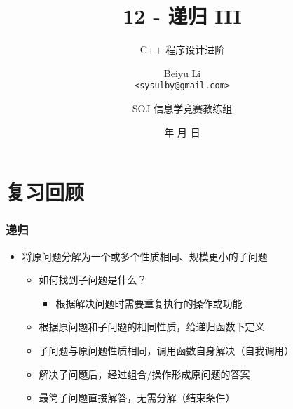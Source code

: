 \title[12 - 递归 III]
{12 - 递归 III}

\subtitle{C++ 程序设计进阶}

\author[Beiyu Li]
{Beiyu Li\\
\texttt{<sysulby@gmail.com>}}


\date[\today]
{\number\year 年 \number\month 月 \number\day 日}




\author[sysulby]
{SOJ 信息学竞赛教练组}

\begin{frame}
    \titlepage
\end{frame}
\setcounter{framenumber}{0} %


\section{复习回顾}

\begin{frame}[fragile]
    \frametitle{递归}

    \begin{itemize}
        \item 将原问题分解为一个或多个性质相同、规模更小的子问题
        \begin{itemize}
            \item 如何找到子问题是什么？
                \begin{itemize}
                    \item 根据解决问题时需要重复执行的操作或功能
                \end{itemize}
            \item 根据原问题和子问题的相同性质，给递归函数下定义
            \item 子问题与原问题性质相同，调用函数自身解决（自我调用）
            \item 解决子问题后，经过组合/操作形成原问题的答案
            \item 最简子问题直接解答，无需分解（结束条件）
       \end{itemize}
    \end{itemize}
    
\end{frame}


